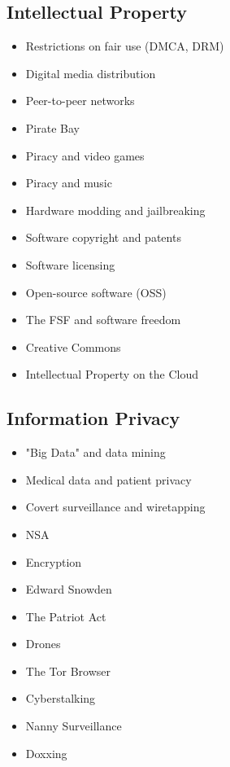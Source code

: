 \documentclass[12pt,a4paper]{report}
\begin{document}
\subsection*{Intellectual Property} 
\begin{itemize}
\item Restrictions on fair use (DMCA, DRM)
\item Digital media distribution
\item Peer-to-peer networks
\item Pirate Bay
\item Piracy and video games
\item Piracy and music
\item Hardware modding and jailbreaking
\item Software copyright and patents
\item Software licensing
\item Open-source software (OSS)
\item The FSF and software freedom
\item Creative Commons
\item Intellectual Property on the Cloud
\end{itemize}

\subsection*{Information Privacy}
\begin{itemize}
\item "Big Data" and data mining
\item Medical data and patient privacy
\item Covert surveillance and wiretapping
\item NSA
\item Encryption
\item Edward Snowden
\item The Patriot Act
\item Drones
\item The Tor Browser
\item Cyberstalking
\item Nanny Surveillance
\item Doxxing
\end{itemize}
\end{document}
